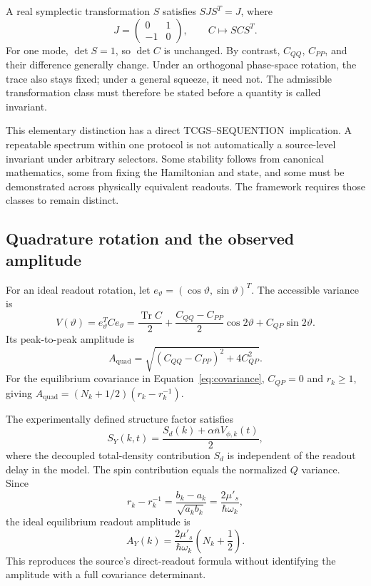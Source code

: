 \documentclass[11pt,a4paper]{article}
\theoremstyle{definition}
\theoremstyle{remark}
\newcommand{\TCGS}{TCGS--SEQUENTION}
\newcommand{\Tr}{\operatorname{Tr}}
\newcommand{\musp}{\mu'_s}
\newcommand{\nb}{\bar n}
\begin{document}
A real symplectic transformation $S$ satisfies $SJS^T=J$, where
\begin{equation}
 J=\begin{pmatrix}0&1\\-1&0\end{pmatrix},\qquad C\longmapsto SCS^T.
 \label{eq:symplectic}
\end{equation}
For one mode, $\det S=1$, so $\det C$ is unchanged. By contrast, $C_{QQ}$, $C_{PP}$, and their difference generally change. Under an orthogonal phase-space rotation, the trace also stays fixed; under a general squeeze, it need not. The admissible transformation class must therefore be stated before a quantity is called invariant.\cite{weedbrook}

This elementary distinction has a direct \TCGS\ implication. A repeatable spectrum within one protocol is not automatically a source-level invariant under arbitrary selectors. Some stability follows from canonical mathematics, some from fixing the Hamiltonian and state, and some must be demonstrated across physically equivalent readouts. The framework requires those classes to remain distinct.\cite{foundation,planck}

\subsection{Quadrature rotation and the observed amplitude}
For an ideal readout rotation, let $e_\vartheta=(\cos\vartheta,\sin\vartheta)^T$. The accessible variance is
\begin{equation}
 V(\vartheta)=e_\vartheta^TCe_\vartheta
 =\frac{\Tr C}{2}
 +\frac{C_{QQ}-C_{PP}}{2}\cos2\vartheta
 +C_{QP}\sin2\vartheta.
 \label{eq:tomography}
\end{equation}
Its peak-to-peak amplitude is
\begin{equation}
 A_{\mathrm{quad}}
 =\sqrt{(C_{QQ}-C_{PP})^2+4C_{QP}^2}.
 \label{eq:general_amplitude}
\end{equation}
For the equilibrium covariance in Equation~\eqref{eq:covariance}, $C_{QP}=0$ and $r_k\geq1$, giving $A_{\mathrm{quad}}=(N_k+1/2)(r_k-r_k^{-1})$.

The experimentally defined structure factor satisfies
\begin{equation}
 S_Y(k,t)=\frac{S_d(k)+\alpha\nb V_{\phi,k}(t)}{2},
 \label{eq:SY}
\end{equation}
where the decoupled total-density contribution $S_d$ is independent of the readout delay in the model. The spin contribution equals the normalized $Q$ variance. Since
\begin{equation}
 r_k-r_k^{-1}=\frac{b_k-a_k}{\sqrt{a_kb_k}}
 =\frac{2\musp}{\hbar\omega_k},
 \label{eq:anisotropy_identity}
\end{equation}
the ideal equilibrium readout amplitude is
\begin{equation}
 A_Y(k)=\frac{2\musp}{\hbar\omega_k}\left(N_k+\frac12\right).
 \label{eq:AY}
\end{equation}
This reproduces the source's direct-readout formula without identifying the amplitude with a full covariance determinant.\cite{zhang2026}
\end{document}
